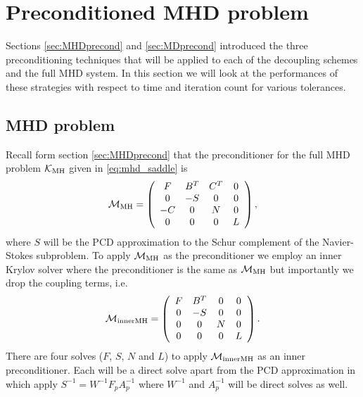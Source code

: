 \section{Preconditioned MHD problem}


Sections \ref{sec:MHDprecond} and \ref{sec:MDprecond} introduced the three preconditioning techniques that will be applied to each of the decoupling schemes and the full MHD system. In this section we will look at the performances of these strategies with respect to time and iteration count for various tolerances.


\subsection{MHD problem}

Recall form section \ref{sec:MHDprecond} that the preconditioner for the full MHD problem ${\mathcal K}_{\rm MH}$ given in \eqref{eq:mhd_saddle} is
\begin{equation} \nonumber
\mathcal{M}_{\rm MH} =
\left(
\begin{array}{cccc}
F & B^T & C^T & 0\\
0 & -S & 0 & 0 \\
-C & 0 & N & 0\\
0 & 0 & 0 & L
\end{array}
\right),
\end{equation}
where $S$ will be the PCD approximation to the Schur complement of the Navier-Stokes subproblem. To apply $\mathcal{M}_{\rm MH}$ as the preconditioner we employ an inner Krylov solver where the preconditioner is the same as  $\mathcal{M}_{\rm MH}$ but importantly we drop the coupling terms, i.e.
\begin{equation} \nonumber
\mathcal{M}_{\rm innerMH} =
\left(
\begin{array}{cccc}
F & B^T & 0 & 0\\
0 & -S & 0 & 0 \\
0 & 0 & N & 0\\
0 & 0 & 0 & L
\end{array}
\right).
\end{equation}
There are four solves ($F$, $S$, $N$ and $L$) to apply $\mathcal{M}_{\rm innerMH}$ as an inner preconditioner. Each will be a direct solve apart from the PCD approximation in which apply $S^{-1} = W^{-1}F_p A_p^{-1}$ where $W^{-1}$ and $A_p^{-1}$ will be direct solves as well.

